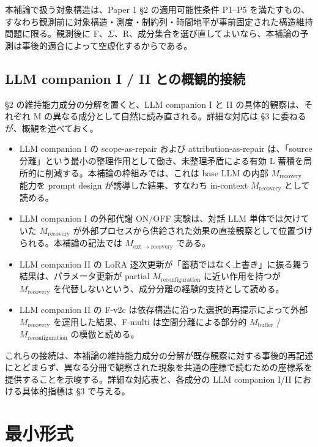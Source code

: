 \documentclass[12pt,a4paper]{article}
\begin{document}
本補論で扱う対象構造は、Paper 1 §2 の適用可能性条件 P1--P5 を満たすもの、すなわち観測前に対象構造・測度・制約列・時間地平が事前固定された構造維持問題に限る。観測後に F、\(\Sigma\)、R、成分集合を選び直してよいなら、本補論の予測は事後的適合によって空虚化するからである。

\subsection{LLM companion I / II との概観的接続}\label{llm-companion-i-ii-ux3068ux306eux6982ux89b3ux7684ux63a5ux7d9a}

§2 の維持能力成分の分解を置くと、LLM companion I と II の具体的観察は、それぞれ M の異なる成分として自然に読み直される。詳細な対応は §3 に委ねるが、概観を述べておく。

\begin{itemize}
\tightlist
\item
  LLM companion I の scope-as-repair および attribution-as-repair は、「source 分離」という最小の整理作用として働き、未整理矛盾による有効 L 蓄積を局所的に削減する。本補論の枠組みでは、これは base LLM の内部 \(M_{\mathrm{recovery}}\) 能力を prompt design が誘導した結果、すなわち in-context \(M_{\mathrm{recovery}}\) として読める。
\item
  LLM companion I の外部代謝 ON/OFF 実験は、対話 LLM 単体では欠けていた \(M_{\mathrm{recovery}}\) が外部プロセスから供給された効果の直接観察として位置づけられる。本補論の記法では \(M_{\mathrm{ext}\to\mathrm{recovery}}\) である。
\item
  LLM companion II の LoRA 逐次更新が「蓄積ではなく上書き」に振る舞う結果は、パラメータ更新が partial \(M_{\mathrm{reconfiguration}}\) に近い作用を持つが \(M_{\mathrm{recovery}}\) を代替しないという、成分分離の経験的支持として読める。
\item
  LLM companion II の F-v2c は依存構造に沿った選択的再提示によって外部 \(M_{\mathrm{recovery}}\) を運用した結果、F-multi は空間分離による部分的 \(M_{\mathrm{buffer}}\) / \(M_{\mathrm{reconfiguration}}\) の模倣と読める。
\end{itemize}

これらの接続は、本補論の維持能力成分の分解が既存観察に対する事後的再記述にとどまらず、異なる分冊で観察された現象を共通の座標で読むための座標系を提供することを示唆する。詳細な対応表と、各成分の LLM companion I/II における具体的指標は §3 で与える。

\section{最小形式}\label{ux6700ux5c0fux5f62ux5f0f}
\end{document}
